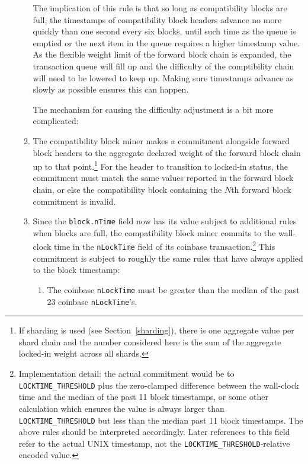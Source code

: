 \begin{enumerate}
\begin{enumerate}
The implication of this rule is that so long as compatibility blocks
are full, the timestamps of compatibility block headers advance no
more quickly than one second every six blocks, until such time as the
queue is emptied or the next item in the queue requires a higher
timestamp value.  As the flexible weight limit of the forward block
chain is expanded, the transaction queue will fill up and the
difficulty of the comptibility chain will need to be lowered to keep
up.  Making sure timestamps advance as slowly as possible ensures this
can happen.

The mechanism for causing the difficulty adjustment is a bit more
complicated:

  \item
    The compatibility block miner makes a commitment alongside forward
    block headers to the aggregate declared weight of the forward
    block chain up to that point.\footnote{If sharding is used (see
    Section~\ref{sharding}), there is one aggregate value per shard
    chain and the number considered here is the sum of the aggregate
    locked-in weight across all shards.}  For the header to transition
    to locked-in status, the commitment must match the same values
    reported in the forward block chain, or else the compatibility
    block containing the $N$th forward block commitment is invalid.

  \item
    Since the {\tt block.nTime} field now has its value subject to
    additional rules when blocks are full, the compatibility block
    miner commits to the wall-clock time in the {\tt nLockTime} field
    of its coinbase transaction.\footnote{Implementation detail: the
    actual commitment would be to {\tt LOCKTIME\_THRESHOLD} plus the
    zero-clamped difference between the wall-clock time and the median
    of the past \num{11} block timestamps, or some other calculation
    which ensures the value is always larger than {\tt
    LOCKTIME\_THRESHOLD} but less than the median past \num{11} block
    timestamps.  The above rules should be interpreted accordingly.
    Later references to this field refer to the actual UNIX timestamp,
    not the {\tt LOCKTIME\_THRESHOLD}-relative encoded value.}  This
    commitment is subject to roughly the same rules that have always
    applied to the block timestamp:

    \begin{enumerate}
      \item
        The coinbase {\tt nLockTime} must be greater than the median
        of the past \num{23} coinbase {\tt nLockTime}'s.\footnotemark


\end{enumerate}
\end{enumerate}
\end{enumerate}
